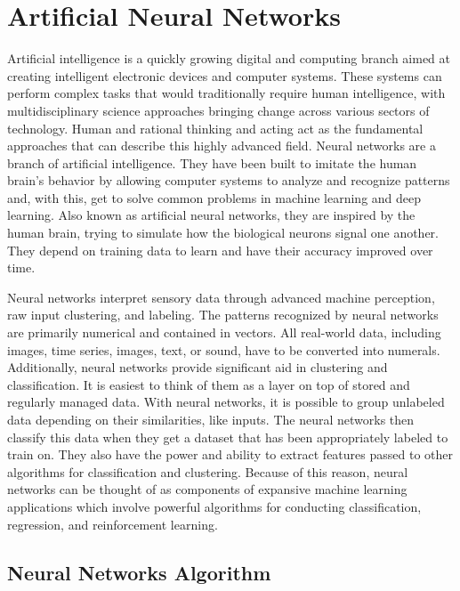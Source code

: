 \documentclass[10pt,conference,a4paper]{IEEEtran}
\begin{document}
\section{Artificial Neural Networks}

Artificial intelligence is a quickly growing digital and computing branch aimed at creating intelligent electronic devices and computer systems. These systems can perform complex tasks that would traditionally require human intelligence, with multidisciplinary science approaches bringing change across various sectors of technology. Human and rational thinking and acting act as the fundamental approaches that can describe this highly advanced field. Neural networks are a branch of artificial intelligence. They have been built to imitate the human brain's behavior by allowing computer systems to analyze and recognize patterns and, with this, get to solve common problems in machine learning and deep learning. Also known as artificial neural networks, they are inspired by the human brain, trying to simulate how the biological neurons signal one another. They depend on training data to learn and have their accuracy improved over time\cite{huang2019}.


Neural networks interpret sensory data through advanced machine perception, raw input clustering, and labeling. The patterns recognized by neural networks are primarily numerical and contained in vectors. All real-world data, including images, time series, images, text, or sound, have to be converted into numerals. Additionally, neural networks provide significant aid in clustering and classification. It is easiest to think of them as a layer on top of stored and regularly managed data. With neural networks, it is possible to group unlabeled data depending on their similarities, like inputs. The neural networks then classify this data when they get a dataset that has been appropriately labeled to train on\cite{huang2019}. They also have the power and ability to extract features passed to other algorithms for classification and clustering. Because of this reason, neural networks can be thought of as components of expansive machine learning applications which involve powerful algorithms for conducting classification, regression, and reinforcement learning.

\subsection{Neural Networks Algorithm}
\end{document}
